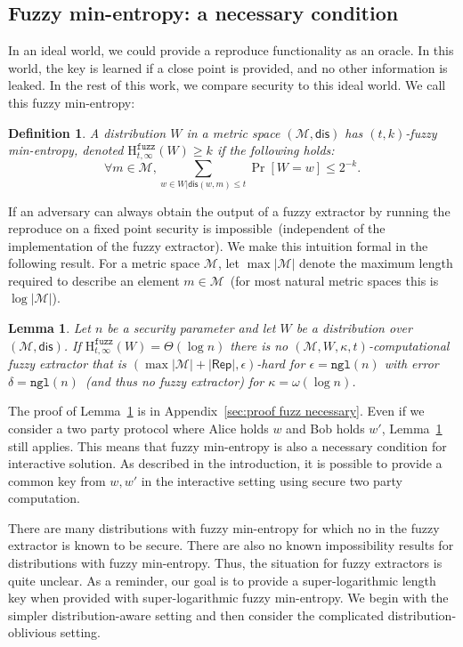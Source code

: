 \documentclass[11pt]{article}
\newcommand{\apref}[1]{\mbox{Appendix~\ref{#1}}}
\newcommand{\lemref}[1]{\mbox{Lemma~\ref{#1}}}
\newcommand{\class}[1]{{\ensuremath{\mathsf{#1}}}}
\newcommand{\rep}{\ensuremath{\class{Rep}}\xspace}
\newcommand{\dis}{\ensuremath{\mathsf{dis}}}
\newcommand{\ngl}{\ensuremath{\mathtt{ngl}}\xspace}
\newcommand{\Hfuzz}{\mathrm{H}^{\mathtt{fuzz}}_{t,\infty}}
\newtheorem{lemma}[theorem]{Lemma}
\newtheorem{definition}[theorem]{Definition}
\begin{document}
\subsection{Fuzzy min-entropy: a necessary condition}
\label{sec:minimal conditions}

In an ideal world, we could provide a reproduce functionality as an oracle.  In this world, the key is learned if a close point is provided, and no other information is leaked.  In the rest of this work, we compare security to this ideal world.  We call this fuzzy min-entropy:

\begin{definition}
\label{def:fuzzy min-ent}
A distribution $W$ in a metric space $(\mathcal{M}, \dis)$ has $(t, k)$-fuzzy min-entropy, denoted $\Hfuzz(W) \ge k$ if the following holds:
\[
\forall m\in \mathcal{M},  \sum_{w\in W | \dis(w, m)\le t} \Pr[W=w] \leq 2^{-k}.
\]
\end{definition}

If an adversary can always obtain the output of a fuzzy extractor by running the reproduce on a fixed point security is impossible~(independent of the implementation of the fuzzy extractor).  We make this intuition formal in the following result.  
For a metric space $\mathcal{M}$, let $\max |\mathcal{M}|$ denote the maximum length required to describe an element $m\in\mathcal{M}$~(for most natural metric spaces this is $\log |\mathcal{M}|$).
\begin{lemma}
\label{lem:fuzz necessary}
Let $n$ be a security parameter and let $W$ be a distribution over $(\mathcal{M}, \dis)$.
If $\Hfuzz (W) = \Theta(\log n)$ there is no $(\mathcal{M}, W, \kappa, t)$-computational fuzzy extractor that is $(\max |\mathcal{M}| +  |\rep|, \epsilon)$-hard for $\epsilon = \ngl(n)$ with error $\delta = \ngl(n)$~(and thus no fuzzy extractor) for $\kappa =\omega(\log n)$.
\end{lemma}

The proof of \lemref{lem:fuzz necessary} is in \apref{sec:proof fuzz necessary}.
Even if we consider a two party protocol where Alice holds $w$ and Bob holds $w'$, 
\lemref{lem:fuzz necessary} still applies.  
This means that fuzzy min-entropy is also a necessary condition for interactive solution.  As described in the introduction, it is possible to provide a common key from $w, w'$ in the interactive setting using secure two party computation.

There are many distributions with fuzzy min-entropy for which no in the fuzzy extractor is known to be secure.  There are also no known impossibility results for distributions with fuzzy min-entropy.  Thus, the situation for fuzzy extractors is quite unclear.
As a reminder, our goal is to provide a super-logarithmic length key when provided with super-logarithmic fuzzy min-entropy.  We begin with the simpler distribution-aware setting and then consider the complicated distribution-oblivious setting.
\end{document}
